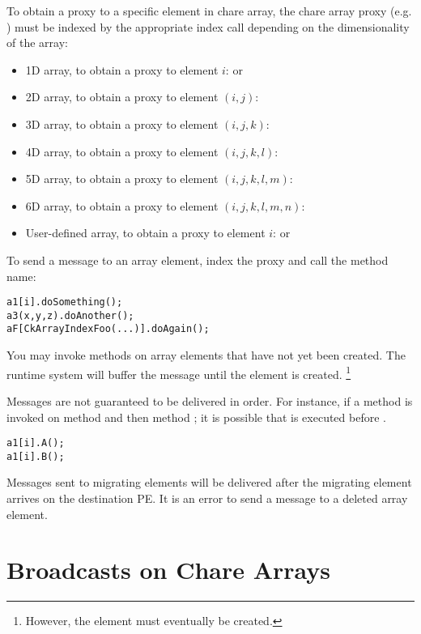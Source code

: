 To obtain a proxy to a specific element in chare array, the chare array proxy
(e.g. ) must be indexed by the appropriate index call depending
on the dimensionality of the array:
%
\begin{itemize}
\item 1D array, to obtain a proxy to element $i$:  or
\item 2D array, to obtain a proxy to element $(i,j)$: 
\item 3D array, to obtain a proxy to element $(i,j,k)$: 
\item 4D array, to obtain a proxy to element $(i,j,k,l)$:
\item 5D array, to obtain a proxy to element $(i,j,k,l,m)$:
\item 6D array, to obtain a proxy to element $(i,j,k,l,m,n)$:
\item User-defined array, to obtain a proxy to element $i$: 
  or 
\end{itemize}
%
To send a  message to an array element, index the proxy
and call the method name:
%
\begin{alltt}
a1[i].doSomething();
a3(x,y,z).doAnother();
aF[CkArrayIndexFoo(...)].doAgain();
\end{alltt}

You may invoke methods on array elements that have not yet been created. The
\charmpp{} runtime system will buffer the message until the element is
created. 
\footnote{However, the element must eventually be created.}

Messages are not guaranteed to be delivered in order. For instance, if a method
is invoked on method  and then method ; it is possible that 
is executed before .
%
\begin{alltt}
a1[i].A();
a1[i].B();
\end{alltt}

Messages sent to migrating elements will be delivered after the migrating
element arrives on the destination PE. It is an error to send a message
to a deleted array element.

\section{Broadcasts on Chare Arrays}

